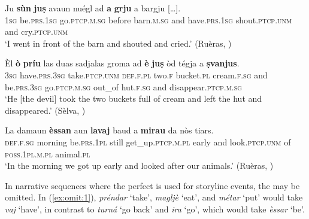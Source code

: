 \ea\label{ex:diff:aux1}
\gll Ju \textbf{sùn} \textbf{juṣ} avaun nuégl ad \textbf{a} \textbf{grju} a bargju […].\\
\textsc{1sg}  be.\textsc{prs.1sg}  go.\textsc{ptcp.m.sg} before barn.\textsc{m.sg} and have.\textsc{prs.1sg} shout.\textsc{ptcp.unm} and cry.\textsc{ptcp.unm}\\
\glt `I went in front of the barn and shouted and cried.' (Ruèras, \citealt[69]{Büchli1966})
\z

\ea\label{ex:diff:aux3}
\gll Èl \textbf{ò} \textbf{príu} las duas sadjalas groma ad \textbf{è} \textbf{juṣ} òd tégja a \textbf{ṣvanjus}.\\
\textsc{3sg}  have.\textsc{prs.3sg} take.\textsc{ptcp.unm} \textsc{def.f.pl} two.\textsc{f} bucket.\textsc{pl}  cream.\textsc{f.sg} and be.\textsc{prs.3sg} go.\textsc{ptcp.m.sg} out\_of hut.\textsc{f.sg} and disappear.\textsc{ptcp.m.sg}\\
\glt `He [the devil] took the two buckets full of cream and left the hut and disappeared.' (Sèlva, \citealt[47]{Büchli1966})
\z

\ea\label{ex:diff:aux2}
\gll La damaun \textbf{èssan} aun \textbf{lavaj} baud a \textbf{mirau} da nòs tiars.\\
\textsc{def.f.sg}  morning be.\textsc{prs.1pl} still get\_up.\textsc{ptcp.m.pl} early and look.\textsc{ptcp.unm} of \textsc{poss.1pl.m.pl} animal.\textsc{pl}\\
\glt `In the morning we got up early and looked after our animals.' (Ruèras, \citealt[68]{Büchli1966})
\z

In narrative sequences where the perfect is used for storyline events, the  may be omitted. In (\ref{ex:omit:1}), \textit{préndar} `take', \textit{magljè} `eat', and \textit{métar} `put' would take \textit{vaj} `have', in contrast to \textit{turná} `go back' and \textit{ira} `go', which would take \textit{èssar} `be'.

